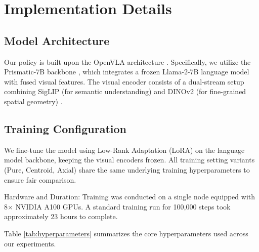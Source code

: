 \section{Implementation Details}
\label{app_sec:implementation_details}

\subsection{Model Architecture}

Our policy is built upon the OpenVLA architecture \citep{DBLP:conf/corl/KimPKXB0RFSVKBT24}. Specifically, we utilize the Prismatic-7B backbone \citep{DBLP:conf/icml/Karamcheti0BLKS24}, which integrates a frozen Llama-2-7B language model with fused visual features. The visual encoder consists of a dual-stream setup combining SigLIP (for semantic understanding) and DINOv2 (for fine-grained spatial geometry) \citep{DBLP:conf/iccv/ZhaiM0B23,DBLP:journals/tmlr/OquabDMVSKFHMEA24}.

\subsection{Training Configuration}

We fine-tune the model using Low-Rank Adaptation (LoRA) on the language model backbone, keeping the visual encoders frozen. All training setting variants (Pure, Centroid, Axial) share the same underlying training hyperparameters to ensure fair comparison.

Hardware and Duration: Training was conducted on a single node equipped with 8$\times$ NVIDIA A100 GPUs. A standard training run for 100,000 steps took approximately 23 hours to complete.

Table \ref{tab:hyperparameters} summarizes the core hyperparameters used across our experiments.

\begin{table}[H]
\centering
\caption{Hyperparameters for OpenVLA fine-tuning on \textsc{Mini-BEHAVIOR-Gran}.}
\label{tab:hyperparameters}
\end{table}

